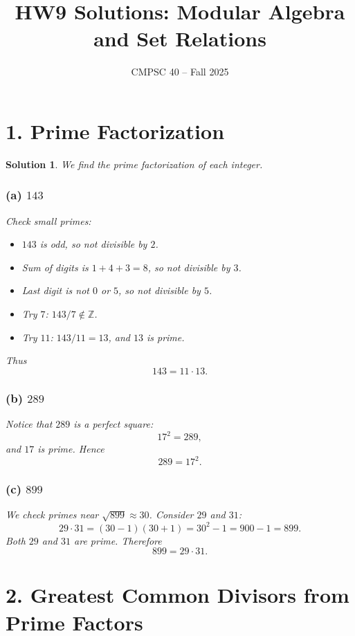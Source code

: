 \documentclass[11pt]{article}
\newtheorem*{solution}{Solution}
\begin{document}
\title{HW9 Solutions: Modular Algebra and Set Relations}
\author{CMPSC 40 -- Fall 2025}
\date{}
\maketitle

\section*{1. Prime Factorization}

\begin{solution}
We find the prime factorization of each integer.

\subsubsection*{(a) $143$}
Check small primes:

\begin{itemize}
  \item $143$ is odd, so not divisible by $2$.
  \item Sum of digits is $1+4+3=8$, so not divisible by $3$.
  \item Last digit is not $0$ or $5$, so not divisible by $5$.
  \item Try $7$: $143 / 7 \notin \mathbb{Z}$.
  \item Try $11$: $143 / 11 = 13$, and $13$ is prime.
\end{itemize}

Thus
\[
143 = 11 \cdot 13.
\]

\subsubsection*{(b) $289$}
Notice that $289$ is a perfect square:
\[
17^2 = 289,
\]
and $17$ is prime. Hence
\[
289 = 17^2.
\]

\subsubsection*{(c) $899$}
We check primes near $\sqrt{899} \approx 30$. Consider $29$ and $31$:
\[
29 \cdot 31 = (30-1)(30+1) = 30^2 - 1 = 900 - 1 = 899.
\]
Both $29$ and $31$ are prime. Therefore
\[
899 = 29 \cdot 31.
\]
\end{solution}

\section*{2. Greatest Common Divisors from Prime Factors}
\end{document}
